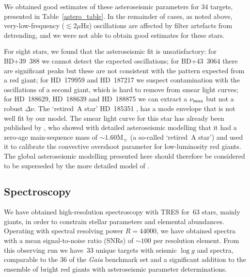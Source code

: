 \documentclass[a4paper,fleqn,usenatbib]{mnras}
\newcommand{\numax}{\mbox{$\nu_{\rm max}$}\xspace}
\newcommand{\Dnu}{\mbox{$\Delta \nu$}\xspace}
\newcommand{\muHz}{\mbox{$\mu$Hz}\xspace}
\newcommand{\logg}{\mbox{$\log g$}\xspace}
\newcommand{\msun}{\mbox{$\mathrm{M}_{\sun}$}\xspace}
\newcommand{\gaia}{\textit{Gaia}\xspace}
\begin{document}
We obtained good estimates of these asteroseismic parameters for 34 targets, presented in Table~\ref{astero_table}. In the remainder of cases, as noted above, very-low-frequency ($\lesssim 2\muHz$) oscillations are affected by filter artefacts from detrending, and we were not able to obtain good estimates for these stars. 


For eight stars, we found that the asteroseismic fit is unsatisfactory: for BD+39~388 we cannot detect the expected oscillations; for BD+43~3064 there are significant peaks but these are not consistent with the pattern expected from a red giant; for HD~179959 and HD~187217 we suspect contamination with the oscillations of a second giant, which is hard to remove from smear light curves; for HD~188629, HD~188639 and HD~188875 we can extract a \numax but not a robust \Dnu. The `retired~A star' HD~185351 \citep[studied by][]{2014ApJ...794...15J}, has a mode envelope that is not well fit by our model. The smear light curve for this star has already been published by \citet{2017MNRAS.464.3713H}, who showed with detailed asteroseismic modelling that it had a zero-age main-sequence mass of $\sim 1.60 \msun$ (a so-called `retired~A star') and used it to calibrate the convective overshoot parameter for low-luminosity red giants. The global asteroseismic modelling presented here should therefore be considered to be superseded by the more detailed model of \citet{2017MNRAS.464.3713H}. 



\subsection{Spectroscopy}
\label{spectroscopy}

We have obtained high-resolution spectroscopy with TRES for~63 stars, mainly giants, in order to constrain stellar parameters and elemental abundances. Operating with spectral resolving power $R=44 000$, we have obtained spectra with a mean signal-to-noise ratio (SNRs) of $\sim 100$  per resolution element. %
From this observing run we have~33 unique targets with seismic \logg and spectra, comparable to the 36 of the \gaia benchmark set \citep{2018RNAAS...2c.152J} and a significant addition to the ensemble of bright red giants with asteroseismic parameter determinations. %
\end{document}
